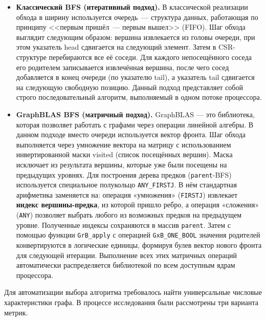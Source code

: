 \documentclass[a4paper]{article}
\begin{document}
\begin{itemize}
    \item \textbf{Классический BFS (итеративный подход).} В классической реализации обхода в ширину используется очередь~--- структура данных, работающая по принципу <<первым пришёл~--- первым вышел>> (FIFO). Шаг обхода выглядит следующим образом: вершина извлекается из головы очереди, при этом указатель head сдвигается на следующий элемент. Затем в CSR-структуре перебираются все её соседи. Для каждого непосещённого соседа его родителем записывается извлечённая вершина, после чего сосед добавляется в конец очереди (по указателю tail), а указатель tail сдвигается на следующую свободную позицию. Данный подход представляет собой строго последовательный алгоритм, выполняемый в одном потоке процессора.
    \item \textbf{GraphBLAS BFS (матричный подход).} GraphBLAS — это библиотека, которая позволяет работать с графами через операции линейной алгебры. В данном подходе вместо очереди используется вектор фронта. Шаг обхода выполняется через умножение вектора на матрицу с использованием инвертированной маски visited (список посещённых вершин). Маска исключает из результата вершины, которые уже были посещены на предыдущих уровнях. Для построения дерева предков (\texttt{parent}-BFS) используется специальное полукольцо \texttt{ANY\_FIRSTJ}. В нём стандартная арифметика заменяется на: операция «умножения» (\texttt{FIRSTJ}) извлекает \textbf{индекс вершины-предка}, из которой пришло ребро, а операция «сложения» (\texttt{ANY}) позволяет выбрать любого из возможных предков на предыдущем уровне. Полученные индексы сохраняются в массив \texttt{parent}. Затем с помощью функции \texttt{GrB\_apply} с операцией \texttt{GxB\_ONE\_BOOL} значения родителей конвертируются в логические единицы, формируя булев вектор нового фронта для следующей итерации. Выполнение всех этих матричных операций автоматически распределяется библиотекой по всем доступным ядрам процессора.
\end{itemize}

Для автоматизации выбора алгоритма требовалось найти универсальные числовые характеристики графа. В процессе исследования были рассмотрены три варианта метрик.
\end{document}
